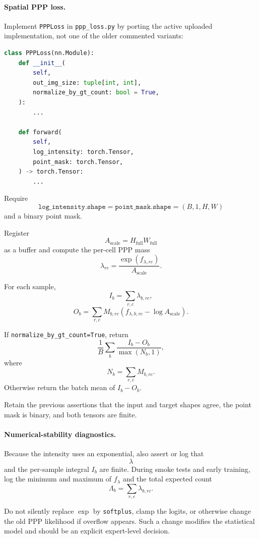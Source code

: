 \documentclass[11pt,a4paper]{article}
\begin{document}
\paragraph{Spatial PPP loss.}
Implement \texttt{PPPLoss} in \texttt{ppp\_loss.py} by porting the active uploaded implementation, not one of the older commented variants:
\begin{lstlisting}[language=Python]
class PPPLoss(nn.Module):
    def __init__(
        self,
        out_img_size: tuple[int, int],
        normalize_by_gt_count: bool = True,
    ):
        ...

    def forward(
        self,
        log_intensity: torch.Tensor,
        point_mask: torch.Tensor,
    ) -> torch.Tensor:
        ...
\end{lstlisting}

Require
\[
    \texttt{log\_intensity.shape}
    =
    \texttt{point\_mask.shape}
    =
    (B,1,H,W)
\]
and a binary point mask.

Register
\[
    A_{\mathrm{scale}}
    =
    H_{\mathrm{full}}W_{\mathrm{full}}
\]
as a buffer and compute the per-cell PPP mass
\[
    \lambda_{rc}
    =
    \frac{\exp(f_{\lambda,rc})}{A_{\mathrm{scale}}}.
\]

For each sample,
\[
    I_b=\sum_{r,c}\lambda_{b,rc},
\]
\[
    O_b=
    \sum_{r,c}
    M_{b,rc}
    \left(
        f_{\lambda,b,rc}
        -
        \log A_{\mathrm{scale}}
    \right).
\]

If \texttt{normalize\_by\_gt\_count=True}, return
\[
    \frac{1}{B}
    \sum_b
    \frac{I_b-O_b}{\max(N_b,1)},
\]
where
\[
    N_b=\sum_{r,c}M_{b,rc}.
\]
Otherwise return the batch mean of \(I_b-O_b\).

Retain the previous assertions that the input and target shapes agree, the point mask is binary, and both tensors are finite.

\paragraph{Numerical-stability diagnostics.}
Because the intensity uses an exponential, also assert or log that
\[
    \lambda
\]
and the per-sample integral \(I_b\) are finite. During smoke tests and early training, log the minimum and maximum of \(f_\lambda\) and the total expected count
\[
    \Lambda_b=\sum_{r,c}\lambda_{b,rc}.
\]

Do not silently replace \(\exp\) by \texttt{softplus}, clamp the logits, or otherwise change the old PPP likelihood if overflow appears. Such a change modifies the statistical model and should be an explicit expert-level decision.
\end{document}
